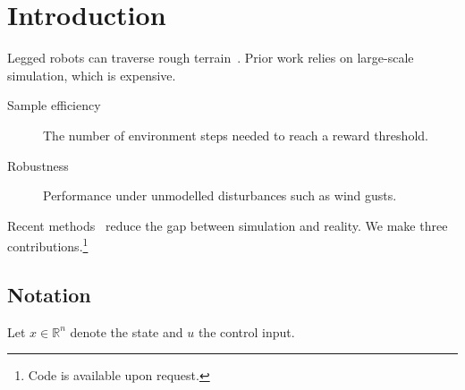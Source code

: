 \section{Introduction}
Legged robots can traverse rough terrain~\cite{smith2020}. Prior work relies on
large-scale simulation, which is expensive.

\begin{description}
\item[Sample efficiency] The number of environment steps needed to reach a reward threshold.
\item[Robustness] Performance under unmodelled disturbances such as wind gusts.
\end{description}

Recent methods~\citep{lee2021} reduce the gap between simulation and reality.
We make three contributions.\footnote{Code is available upon request.}

\subsection{Notation}
Let $x \in \mathbb{R}^n$ denote the state and $u$ the control input.
